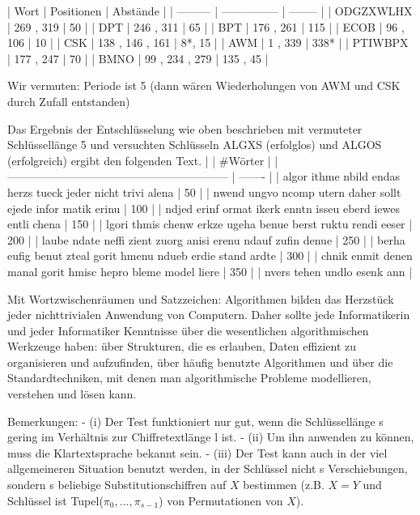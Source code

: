 \documentclass[a4paper]{article}
\begin{document}
\begin{multicols}{3}
    | Wort      | Positionen      | Abstände |
    | --------- | --------------- | -------- |
    | ODGZXWLHX | 269 , 319       | 50       |
    | DPT       | 246 , 311       | 65       |
    | BPT       | 176 , 261       | 115      |
    | ECOB      | 96 , 106        | 10       |
    | CSK       | 138 , 146 , 161 | 8*, 15   |
    | AWM       | 1 , 339         | 338*     |
    | PTIWBPX   | 177 , 247       | 70       |
    | BMNO      | 99 , 234 , 279  | 135 , 45 |

    Wir vermuten: Periode ist 5 (dann wären Wiederholungen von AWM und CSK durch Zufall entstanden)

    Das Ergebnis der Entschlüsselung wie oben beschrieben mit vermuteter Schlüssellänge 5 und versuchten Schlüsseln ALGXS (erfolglos) und ALGOS (erfolgreich) ergibt den folgenden Text.
    |                                                             | \#Wörter |
    | ----------------------------------------------------------- | ------- |
    | algor ithme nbild endas herzs tueck jeder nicht trivi alena | 50      |
    | nwend ungvo ncomp utern daher sollt ejede infor matik erinu | 100     |
    | ndjed erinf ormat ikerk enntn isseu eberd iewes entli chena | 150     |
    | lgori thmis chenw erkze ugeha benue berst ruktu rendi eeser | 200     |
    | laube ndate neffi zient zuorg anisi erenu ndauf zufin denue | 250     |
    | berha eufig benut zteal gorit hmenu ndueb erdie stand ardte | 300     |
    | chnik enmit denen manal gorit hmisc hepro bleme model liere | 350     |
    | nvers tehen undlo esenk ann                                 |

    Mit Wortzwischenräumen und Satzzeichen:
    Algorithmen bilden das Herzstück jeder nichttrivialen Anwendung von Computern. Daher sollte jede Informatikerin und jeder Informatiker Kenntnisse über die wesentlichen algorithmischen Werkzeuge haben: über Strukturen, die es erlauben, Daten effizient zu organisieren und aufzufinden, über häufig benutzte Algorithmen und über die Standardtechniken, mit denen man algorithmische Probleme modellieren, verstehen und lösen kann.

    Bemerkungen:
    - (i) Der Test funktioniert nur gut, wenn die Schlüssellänge s gering im Verhältnis zur Chiffretextlänge l ist.
    - (ii) Um ihn anwenden zu können, muss die Klartextsprache bekannt sein.
    - (iii) Der Test kann auch in der viel allgemeineren Situation benutzt werden, in der Schlüssel nicht s Verschiebungen, sondern s beliebige Substitutionschiffren auf $X$ bestimmen (z.B. $X=Y$ und Schlüssel ist Tupel($\pi_0,...,\pi_{s-1}$) von Permutationen von $X$).


\end{multicols}
\end{document}
